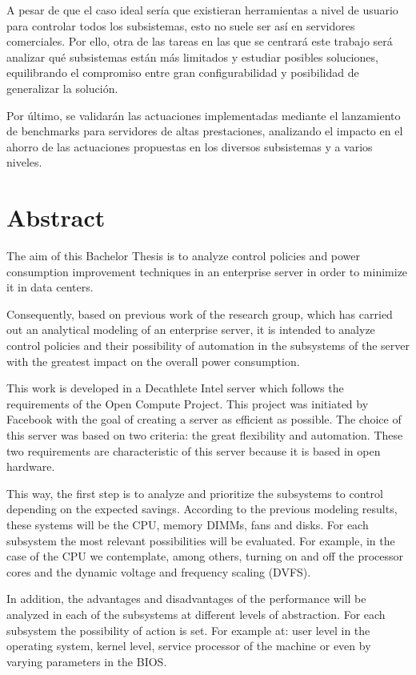 A pesar de que el caso ideal sería que existieran herramientas a nivel de usuario para controlar todos los subsistemas, esto no suele ser así en servidores comerciales. Por ello, otra de las tareas en las que se centrará este trabajo será analizar qué subsistemas están más limitados y estudiar posibles soluciones, equilibrando el compromiso entre gran configurabilidad y posibilidad de generalizar la solución. 

Por último, se validarán las actuaciones implementadas mediante el lanzamiento de benchmarks para servidores de altas prestaciones, analizando el impacto en el ahorro de las actuaciones propuestas en los diversos subsistemas y a varios niveles.


\section*{Abstract}
The aim of this Bachelor Thesis is to analyze control policies and power consumption improvement techniques in an enterprise server in order to minimize it in data centers.

Consequently, based on previous work of the research group, which has carried out an analytical modeling of an enterprise server, it is intended to analyze control policies and their possibility of automation in the subsystems of the server with the greatest impact on the overall power consumption.

This work is developed in a Decathlete Intel server which follows the requirements of the Open Compute Project. This project was initiated by Facebook with the goal of creating a server as efficient as possible. The choice of this server was based on two criteria: the great flexibility and automation. These two requirements are characteristic of this server because it is based in open hardware.

This way, the first step is to analyze and prioritize the subsystems to control depending on the expected savings. According to the previous modeling results, these systems will be the CPU, memory DIMMs, fans and disks. For each subsystem the most relevant possibilities will be evaluated. For example, in the case of the CPU we contemplate, among others, turning on and off the processor cores and the dynamic voltage and frequency scaling (DVFS).

In addition, the advantages and disadvantages of the performance will be analyzed in each of the subsystems at different levels of abstraction. For each subsystem the possibility of action is set. For example at: user level in the operating system, kernel level, service processor of the machine or even by varying parameters in the BIOS.

